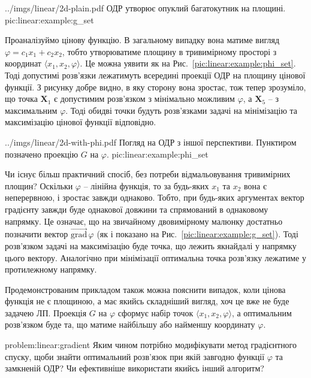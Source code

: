 \documentclass[\main/book.tex]{subfiles}
\begin{document}
\illustration
 {../imgs/linear/2d-plain.pdf}
 {ОДР утворює опуклий багатокутник на площині.}
 {pic:linear:example:g_set}

Проаналізуймо цінову функцію. В загальному випадку вона матиме вигляд $\varphi = c_1 x_1 + c_2 x_2$, тобто утворюватиме площину в тривимірному просторі з координат $\langle x_1, x_2, \varphi \rangle$. Це можна уявити як на Рис.~\ref{pic:linear:example:phi_set}. Тоді допустимі розв'язки лежатимуть всередині проекції ОДР на площину цінової функції. З рисунку добре видно, в яку сторону вона зростає, тож тепер зрозуміло, що точка $\mathbf{X}_1$ є допустимим розв'язком з мінімально можливим $\varphi$, а $\mathbf{X}_5$ -- з максимальним $\varphi$. Тоді обидві точки будуть розв'язками задачі на мінімізацію та максимізацію цінової функції відповідно.

\illustration
 {../imgs/linear/2d-with-phi.pdf}
 {Погляд на ОДР з іншої перспективи. Пунктиром позначено проекцію $G$ на $\varphi$.}
 {pic:linear:example:phi_set}

Чи існує більш практичний спосіб, без потреби відмальовування тривимірних площин? Оскільки $\varphi$ -- лінійна функція, то за будь-яких $x_1$ та $x_2$ вона є неперервною, і зростає завжди однаково. Тобто, при будь-яких аргументах вектор градієнту завжди буде однакової довжини та спрямований в однаковому напрямку. Це означає, що на звичайному двовимірному малюнку достатньо позначити вектор $\overrightarrow{\mathrm{grad}}\,\varphi$ (як і показано на Рис.~\ref{pic:linear:example:g_set}). Тоді розв'язком задачі на максимізацію буде точка, що лежить якнайдалі у напрямку цього вектору. Аналогічно при мінімізації оптимальна точка розв'язку лежатиме у протилежному напрямку.

\begin{note}
 Продемонстрованим прикладом також можна пояснити випадок, коли цінова функція не є площиною, а має якийсь складніший вигляд, хоч це вже не буде задачею ЛП. Проекція $G$ на $\varphi$ сформує набір точок $\langle x_1, x_2, \varphi \rangle$, а оптимальним розв'язком буде та, що матиме найбільшу або найменшу координату $\varphi$.
\end{note}

\begin{problem}{problem:linear:gradient}
 Яким чином потрібно модифікувати метод градієнтного спуску, щоби знайти оптимальний розв'язок при якій завгодно функції $\varphi$ та замкненій ОДР? Чи ефективніше використати якийсь інший алгоритм?
\end{problem}
\end{document}
